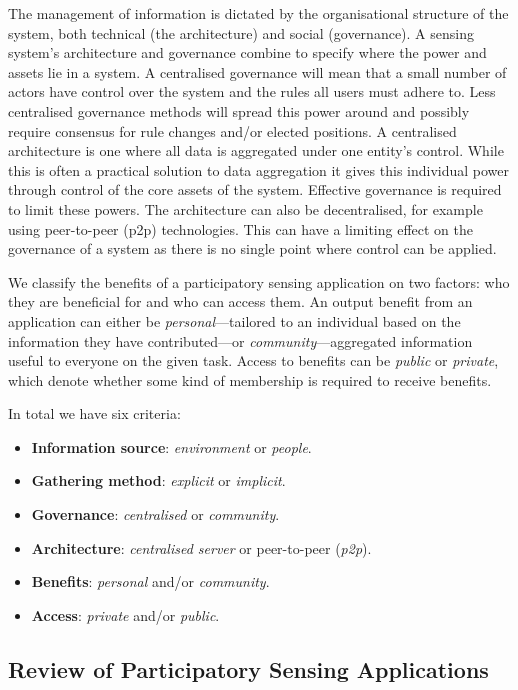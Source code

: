 The management of information is dictated by the organisational structure of the system, both technical (the architecture) and social (governance). A sensing system's architecture and governance combine to specify where the power and assets lie in a system. A centralised governance will mean that a small number of actors have control over the system and the rules all users must adhere to. Less centralised governance methods will spread this power around and possibly require consensus for rule changes and/or elected positions. A centralised architecture is one where all data is aggregated under one entity's control. 
While this is often a practical solution to data aggregation it gives this individual power through control of the core assets of the system. 
Effective governance is required to limit these powers. The architecture can also be decentralised, for example using peer-to-peer (p2p) technologies. This can have a limiting effect on the governance of a system as there is no single point where control can be applied. 

We classify the benefits of a participatory sensing application on two factors: who they are beneficial for and who can access them. 
An output benefit from an application can either be \emph{personal}---tailored to an individual based on the information they have contributed---or \emph{community}---aggregated information useful to everyone on the given task. 
Access to benefits can be \emph{public} or \emph{private}, which denote whether some kind of membership is required to receive benefits.

In total we have six criteria:
\begin{itemize}
\item \textbf{Information source}: \emph{environment} or \emph{people}.
\item \textbf{Gathering method}: \emph{explicit} or \emph{implicit}.
\item \textbf{Governance}: \emph{centralised} or \emph{community}.
\item \textbf{Architecture}: \emph{centralised server} or peer-to-peer (\emph{p2p}).
\item \textbf{Benefits}: \emph{personal} and/or \emph{community}.
\item \textbf{Access}: \emph{private} and/or \emph{public}.
\end{itemize}

\subsection{Review of Participatory Sensing Applications}

